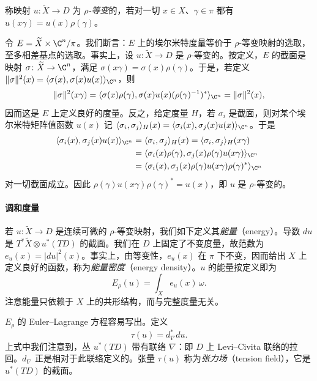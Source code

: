 \begin{definition}
称映射 $u\colon\widetilde X\to D$ 为 \emph{$\rho$-等变}的，若对一切 $x\in X$、$\gamma\in\pi$ 都有 $u(x\gamma)=u(x)\rho(\gamma)$。
\end{definition}

令 $E=\widetilde X\times\C^n/\pi$。我们断言：$E$ 上的埃尔米特度量等价于 $\rho$-等变映射的选取，至多相差基点的选取。事实上，设 $u\colon\widetilde X\to D$ 是 $\rho$-等变的。按定义，$E$ 的截面是映射 $\sigma\colon\widetilde X\to\C^n$，满足 $\sigma(x\gamma)=\sigma(x)\rho(\gamma)$。于是，若定义 $\|\sigma\|^2(x)=\langle\sigma(x),\sigma(x)u(x)\rangle_{\C^n}$，则
\[
\|\sigma\|^2(x\gamma)=\langle\sigma(x)\rho(\gamma),\sigma(x)u(x)(\rho(\gamma)^{-1})^*\rangle_{\C^n}=\|\sigma\|^2(x),
\]
因而这是 $E$ 上定义良好的度量。反之，给定度量 $H$，若 $\sigma_i$ 是截面，则对某个埃尔米特矩阵值函数 $u(x)$ 记 $\langle\sigma_i,\sigma_j\rangle_H(x)=\langle\sigma_i(x),\sigma_j(x)u(x)\rangle_{\C^n}$。于是
\[
\begin{aligned}
\langle\sigma_i(x),\sigma_j(x)u(x)\rangle_{\C^n}&=\langle\sigma_i,\sigma_j\rangle_H(x)=\langle\sigma_i,\sigma_j\rangle_H(x\gamma)\\
&=\langle\sigma_i(x)\rho(\gamma),\sigma_j(x)\rho(\gamma)u(x\gamma)\rangle_{\C^n}\\
&=\langle\sigma_i(x),\sigma_j(x)\rho(\gamma)u(x\gamma)\rho(\gamma)^*\rangle_{\C^n}
\end{aligned}
\]
对一切截面成立。因此 $\rho(\gamma)u(x\gamma)\rho(\gamma)^*=u(x)$，即 $u$ 是 $\rho$-等变的。

\paragraph{调和度量} 若 $u\colon\widetilde X\to D$ 是连续可微的 $\rho$-等变映射，我们如下定义其\emph{能量}（energy）。导数 $du$ 是 $T^*\widetilde X\otimes u^*(TD)$ 的截面。我们在 $D$ 上固定了不变度量，故范数为 $e_u(x)=|du|^2(x)$。事实上，由等变性，$e_u(x)$ 在 $\pi$ 下不变，因而给出 $X$ 上定义良好的函数，称为\emph{能量密度}（energy density）。$u$ 的能量按定义即为
\begin{equation}
E_\rho(u)=\int_X e_u(x)\,\omega.
\label{eq:4.37}\tag{4.37}
\end{equation}
注意能量只依赖于 $X$ 上的共形结构，而与完整度量无关。

$E_\rho$ 的 Euler--Lagrange 方程容易写出。定义
\begin{equation}
\tau(u)=d^*_{\nabla}du.
\label{eq:4.38}\tag{4.38}
\end{equation}
上式中我们注意到，丛 $u^*(TD)$ 带有联络 $\nabla$：即 $D$ 上 Levi--Civita 联络的拉回。$d_{\nabla}$ 正是相对于此联络定义的。张量 $\tau(u)$ 称为\emph{张力场}（tension field），它是 $u^*(TD)$ 的截面。

